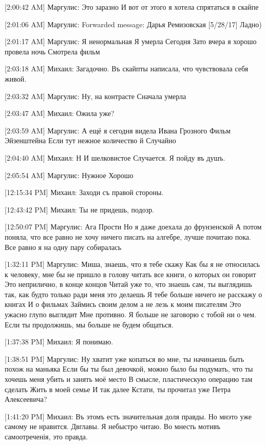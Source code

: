 \documentclass{article}
\newcommand{\yat}{{\fontencoding{X2}\selectfont\cyryat}} %
\begin{document}
{[2:00:42 AM] Маргулис:
Это заразно
 И вот от этого я хотела спрятаться в скайпе

[2:01:06 AM] Маргулис:
Forwarded message: Дарья Ремизовская [5/28/17] 
Ладно)

[2:01:17 AM] Маргулис:
Я ненормальная
 Я умерла
 Сегодня
 Зато вчера я хорошо провела ночь
 Смотрела фильм

[2:03:18 AM] Михаил:
Загадочно. Въ скайп\yat ты написала, что чувствовала себя живой.

[2:03:32 AM] Маргулис:
Ну, на контрасте
 Сначала умерла

[2:03:47 AM] Михаил:
Ожила уже?

[2:03:59 AM] Маргулис:
А ещё я сегодня видела Ивана Грозного
 Фильм
 Эйзенштейна
 Если тут нежное количество й
 Случайно

[2:04:40 AM] Михаил:
Н
 И шелковистое
 Случается.
 Я пойду въ душъ.

[2:05:54 AM] Маргулис:
Нужное
 Хорошо

[12:15:34 PM] Михаил:
Заходи съ правой стороны.

[12:43:42 PM] Михаил:
Ты не придешь, подозр.

[12:50:07 PM] Маргулис:
Ага
 Прости
 Но я даже доехала до фрунзенской
 А потом поняла, что все равно не хочу ничего писать на алгебре, лучше почитаю пока. Все равно я на одну пару собиралась

[1:32:11 PM] Маргулис:
Миша, знаешь, что я тебе скажу
 Как бы я не относилась к человеку, мне бы не пришло в голову читать все книги, о которых он говорит
 Это неприлично, в конце концов
 Читай уже то, что знаешь сам, ты выглядишь так, как будто только ради меня это делаешь
 Я тебе больше ничего не расскажу о книгах
 И о фильмах
 Займись своим делом а не лезь к моим писателям
 Это ужасно глупо выглядит
 Мне противно. Я больше не заговорю с тобой ни о чем.
 Если ты продолжишь, мы больше не будем общаться.

[1:37:38 PM] Михаил:
Я понимаю.

[1:38:51 PM] Маргулис:
Ну хватит уже копаться во мне, ты начинаешь быть похож на маньяка
 Если бы ты был девочкой, можно было бы подумать, что ты хочешь меня убить и занять моё место
 В смысле, пластическую операцию там сделать
 Жить в моей семье
 И так далее
 Кстати, ты прочитал уже Петра Алексеевича?

[1:41:20 PM] Михаил:
Въ этомъ есть значительная доля правды. Но мн\yat это уже самому не нравится.
 Дв\yat главы. Я небыстро читаю.
 Во мн\yat есть мотивъ самоотреченія, это правда.

}
\end{document}
